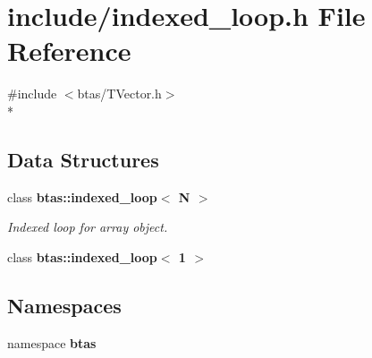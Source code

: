 \section{include/indexed\-\_\-loop.h File Reference}
\label{d0/d6e/indexed__loop_8h}
{\ttfamily \#include $<$btas/\-T\-Vector.\-h$>$}\\*
\subsection*{Data Structures}
\begin{DoxyCompactItemize}
\item 
class {\bf btas\-::indexed\-\_\-loop$<$ N $>$}
\begin{DoxyCompactList}\small\item\em Indexed loop for array object. \end{DoxyCompactList}\item 
class {\bf btas\-::indexed\-\_\-loop$<$ 1 $>$}
\end{DoxyCompactItemize}
\subsection*{Namespaces}
\begin{DoxyCompactItemize}
\item 
namespace {\bf btas}
\end{DoxyCompactItemize}

